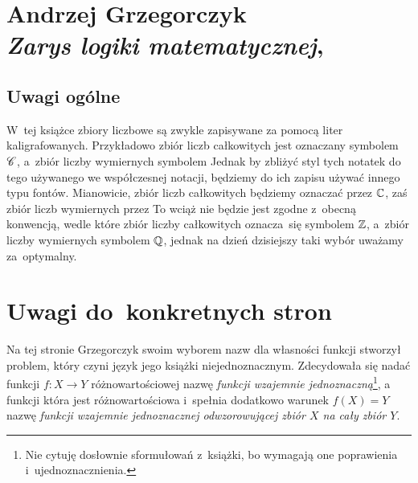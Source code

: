 \documentclass[a4paper,11pt]{article}
\numberwithin{equation}{section}
\begin{document}
\VerSpaceSix












\newpage

\section{Andrzej Grzegorczyk \\
  \textit{Zarys logiki matematycznej},
  \parencite{Grzegorczyk-Zarys-logiki-matematycznej-Pub-1975}}

\VerSpaceTwo



\subsection{Uwagi ogólne}

\label{ssec:Grzegorczyk-Zarys-ETC-Uwagi-ogolne}


\noindent
W~tej książce zbiory liczbowe są zwykle zapisywane za pomocą liter
kaligrafowanych. Przykładowo zbiór liczb całkowitych jest oznaczany symbolem
$\mathcal{C}$, a~zbiór liczby wymiernych symbolem %
Jednak by zbliżyć styl tych notatek do tego używanego we współczesnej
notacji, będziemy do ich zapisu używać innego typu fontów. Mianowicie,
zbiór liczb całkowitych będziemy oznaczać przez $\mathbb{C}$, zaś zbiór liczb
wymiernych przez %
To wciąż nie będzie jest zgodne z~obecną konwencją, wedle które zbiór liczby
całkowitych oznacza~się symbolem $\mathbb{Z}$, a~zbiór liczby wymiernych symbolem
$\mathbb{Q}$, jednak na dzień dzisiejszy taki wybór uważamy za~optymalny.

\VerSpaceTwo





\section{Uwagi do~konkretnych stron}

\label{sec:Grzegorczyk-Zarys-ETC-Uwagi-do-konkretnych-stron}


\noindent
{} Na tej stronie Grzegorczyk swoim wyborem nazw dla
własności funkcji stworzył problem, który czyni język jego książki
niejednoznacznym. Zdecydowała się nadać funkcji $f : X \to Y$
różnowartościowej nazwę \textit{funkcji wzajemnie
  jednoznaczną}\footnote{Nie cytuję dosłownie sformułowań z~książki,
  bo wymagają one poprawienia i~ujednoznacznienia.}, a funkcji która
jest różnowartościowa i~spełnia dodatkowo warunek $f( X ) = Y$ nazwę
\textit{funkcji wzajemnie jednoznacznej odwzorowującej zbiór $X$ na cały
  zbiór $Y$}.
\end{document}
